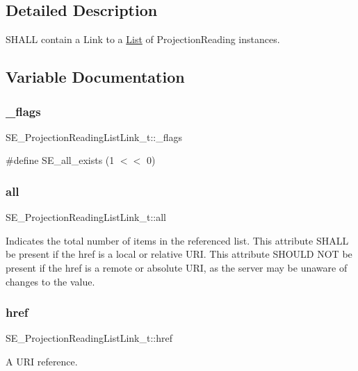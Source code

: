 \subsection{Detailed Description}
S\+H\+A\+LL contain a Link to a \hyperlink{structList}{List} of Projection\+Reading instances. 

\subsection{Variable Documentation}
\mbox{\label{group__ProjectionReadingListLink_ga28822e53e74267ba142e26907d8f61ed}} 
\subsubsection{\texorpdfstring{\+\_\+flags}{\_flags}}
{\footnotesize\ttfamily S\+E\+\_\+\+Projection\+Reading\+List\+Link\+\_\+t\+::\+\_\+flags}

\#define S\+E\+\_\+all\+\_\+exists (1 $<$$<$ 0) \mbox{\label{group__ProjectionReadingListLink_ga7df090bbabfbd3611d690fac792b316e}} 
\subsubsection{\texorpdfstring{all}{all}}
{\footnotesize\ttfamily S\+E\+\_\+\+Projection\+Reading\+List\+Link\+\_\+t\+::all}

Indicates the total number of items in the referenced list. This attribute S\+H\+A\+LL be present if the href is a local or relative U\+RI. This attribute S\+H\+O\+U\+LD N\+OT be present if the href is a remote or absolute U\+RI, as the server may be unaware of changes to the value. \mbox{\label{group__ProjectionReadingListLink_ga20949473f08a344c7982015365a5ab35}} 
\subsubsection{\texorpdfstring{href}{href}}
{\footnotesize\ttfamily S\+E\+\_\+\+Projection\+Reading\+List\+Link\+\_\+t\+::href}

A U\+RI reference. 